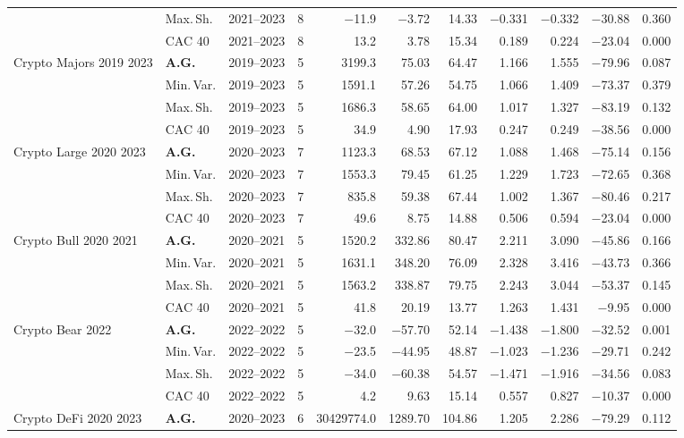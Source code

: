 \begin{longtable}{p{2.6cm} l c c r r r r r r r}
 & Max.\,Sh. & 2021--2023 & 8 & $-$11.9 & $-$3.72 & 14.33 & $-$0.331 & $-$0.332 & $-$30.88 & 0.360 \\
 & CAC 40 & 2021--2023 & 8 & 13.2 & 3.78 & 15.34 & 0.189 & 0.224 & $-$23.04 & 0.000 \\
\midrule
Crypto Majors 2019 2023 & \textbf{A.G.} & 2019--2023 & 5 & 3199.3 & 75.03 & 64.47 & 1.166 & 1.555 & $-$79.96 & 0.087 \\
 & Min.\,Var. & 2019--2023 & 5 & 1591.1 & 57.26 & 54.75 & 1.066 & 1.409 & $-$73.37 & 0.379 \\
 & Max.\,Sh. & 2019--2023 & 5 & 1686.3 & 58.65 & 64.00 & 1.017 & 1.327 & $-$83.19 & 0.132 \\
 & CAC 40 & 2019--2023 & 5 & 34.9 & 4.90 & 17.93 & 0.247 & 0.249 & $-$38.56 & 0.000 \\
\midrule
Crypto Large 2020 2023 & \textbf{A.G.} & 2020--2023 & 7 & 1123.3 & 68.53 & 67.12 & 1.088 & 1.468 & $-$75.14 & 0.156 \\
 & Min.\,Var. & 2020--2023 & 7 & 1553.3 & 79.45 & 61.25 & 1.229 & 1.723 & $-$72.65 & 0.368 \\
 & Max.\,Sh. & 2020--2023 & 7 & 835.8 & 59.38 & 67.44 & 1.002 & 1.367 & $-$80.46 & 0.217 \\
 & CAC 40 & 2020--2023 & 7 & 49.6 & 8.75 & 14.88 & 0.506 & 0.594 & $-$23.04 & 0.000 \\
\midrule
Crypto Bull 2020 2021 & \textbf{A.G.} & 2020--2021 & 5 & 1520.2 & 332.86 & 80.47 & 2.211 & 3.090 & $-$45.86 & 0.166 \\
 & Min.\,Var. & 2020--2021 & 5 & 1631.1 & 348.20 & 76.09 & 2.328 & 3.416 & $-$43.73 & 0.366 \\
 & Max.\,Sh. & 2020--2021 & 5 & 1563.2 & 338.87 & 79.75 & 2.243 & 3.044 & $-$53.37 & 0.145 \\
 & CAC 40 & 2020--2021 & 5 & 41.8 & 20.19 & 13.77 & 1.263 & 1.431 & $-$9.95 & 0.000 \\
\midrule
Crypto Bear 2022 & \textbf{A.G.} & 2022--2022 & 5 & $-$32.0 & $-$57.70 & 52.14 & $-$1.438 & $-$1.800 & $-$32.52 & 0.001 \\
 & Min.\,Var. & 2022--2022 & 5 & $-$23.5 & $-$44.95 & 48.87 & $-$1.023 & $-$1.236 & $-$29.71 & 0.242 \\
 & Max.\,Sh. & 2022--2022 & 5 & $-$34.0 & $-$60.38 & 54.57 & $-$1.471 & $-$1.916 & $-$34.56 & 0.083 \\
 & CAC 40 & 2022--2022 & 5 & 4.2 & 9.63 & 15.14 & 0.557 & 0.827 & $-$10.37 & 0.000 \\
\midrule
Crypto DeFi 2020 2023 & \textbf{A.G.} & 2020--2023 & 6 & 30429774.0 & 1289.70 & 104.86 & 1.205 & 2.286 & $-$79.29 & 0.112 \\

\end{longtable}
